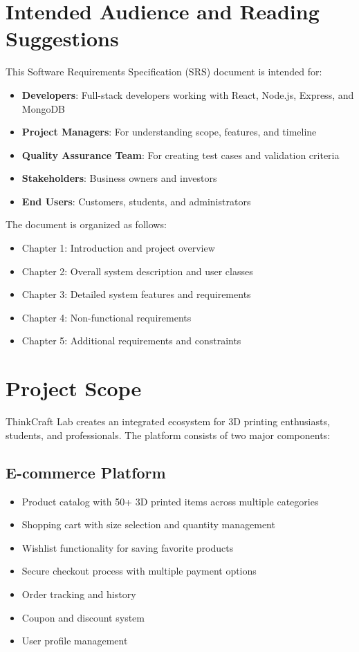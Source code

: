\documentclass{scrreprt}
\begin{document}
\section{Intended Audience and Reading Suggestions}
This Software Requirements Specification (SRS) document is intended for:
\begin{itemize}
\item \textbf{Developers}: Full-stack developers working with React, Node.js, Express, and MongoDB
\item \textbf{Project Managers}: For understanding scope, features, and timeline
\item \textbf{Quality Assurance Team}: For creating test cases and validation criteria
\item \textbf{Stakeholders}: Business owners and investors
\item \textbf{End Users}: Customers, students, and administrators
\end{itemize}

The document is organized as follows:
\begin{itemize}
\item Chapter 1: Introduction and project overview
\item Chapter 2: Overall system description and user classes
\item Chapter 3: Detailed system features and requirements
\item Chapter 4: Non-functional requirements
\item Chapter 5: Additional requirements and constraints
\end{itemize}

\section{Project Scope}
ThinkCraft Lab creates an integrated ecosystem for 3D printing enthusiasts, students, and professionals. The platform consists of two major components:

\subsection{E-commerce Platform}
\begin{itemize}
\item Product catalog with 50+ 3D printed items across multiple categories
\item Shopping cart with size selection and quantity management
\item Wishlist functionality for saving favorite products
\item Secure checkout process with multiple payment options
\item Order tracking and history
\item Coupon and discount system
\item User profile management
\end{itemize}
\end{document}
